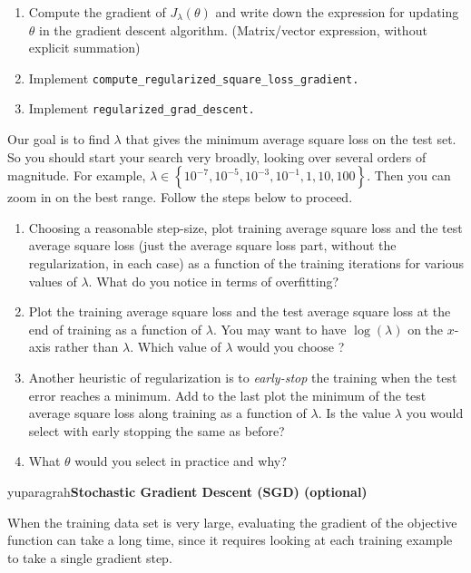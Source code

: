 \documentclass{article}
\begin{document}
\begin{enumerate}
\setcounter{enumi}{\value{saveenum}}
\item Compute the gradient of $J_\lambda(\theta)$ and write down the expression
for updating $\theta$ in the gradient descent algorithm. (Matrix/vector
expression, without explicit summation)
\item Implement \texttt{compute\_regularized\_square\_loss\_gradient.}
\item Implement \texttt{regularized\_grad\_descent.}
\setcounter{saveenum}{\value{enumi}}
\end{enumerate}

Our goal is to find $\lambda$
that gives the minimum average square loss on the test set. So you should start your search very broadly, looking
over several orders of magnitude. For example, $\lambda\in\left\{ 10^{-7},10^{-5},10^{-3},10^{-1},1,10,100\right\} $.
Then you can zoom in on the best range. Follow the steps below to proceed.
\begin{enumerate}
\setcounter{enumi}{\value{saveenum}}
\item 
Choosing a reasonable step-size, plot training average square loss and
the test average square loss (just the average square loss part, without the regularization, in each case) as a function of the training iterations for various values of $\lambda$. What do you notice in terms of overfitting?


\item Plot the training average square loss and
the test average square loss at the end of training as a function of $\lambda$. You may
want to have $\log(\lambda)$ on the $x$-axis rather than $\lambda$.
Which value of $\lambda$ would you choose ?  

\item Another heuristic of regularization is to \emph{early-stop} the training when the test error reaches a minimum. Add to the last plot the minimum of the test average square loss along training as a function of $\lambda$.
Is the value $\lambda$ you would select with early stopping the same as before? 


\item What $\theta$ would you select in practice and why?
\setcounter{saveenum}{\value{enumi}}
\end{enumerate}

\vspace{0.3cm}
yuparagrah{\bf Stochastic Gradient Descent (SGD) (optional)}

When the training data set is very large, evaluating the
gradient of the objective function can take a long time, since it
requires looking at each training example to take a single gradient
step. 
\end{document}

